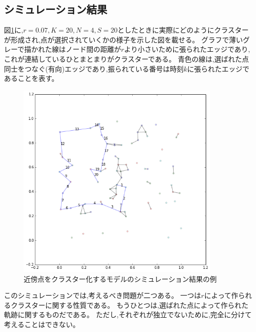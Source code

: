 \subsection{シミュレーション結果}
図\ref{fig:f15}に,$r=0.07, K=20, N=4, S=20$としたときに実際にどのようにクラスターが形成され,点が選択されていくかの様子を示した図を載せる。
グラフで薄いグレーで描かれた線はノード間の距離が$r$より小さいために張られたエッジであり,これが連結しているひとまとまりがクラスターである。
青色の線は,選ばれた点同士をつなぐ(有向)エッジであり,振られている番号は時刻$k$に張られたエッジであることを表す。
\begin{figure}[H]
    \begin{center}
        \includegraphics[width=10cm]{../img/cluster.png}
        \caption{近傍点をクラスター化するモデルのシミュレーション結果の例}
        \label{fig:f15}
    \end{center}
\end{figure}

このシミュレーションでは,考えるべき問題が二つある。
一つは$r$によって作られるクラスターに関する性質である。
もうひとつは,選ばれた点によって作られた軌跡に関するものだである。
ただし,それぞれが独立でないために,完全に分けて考えることはできない。

